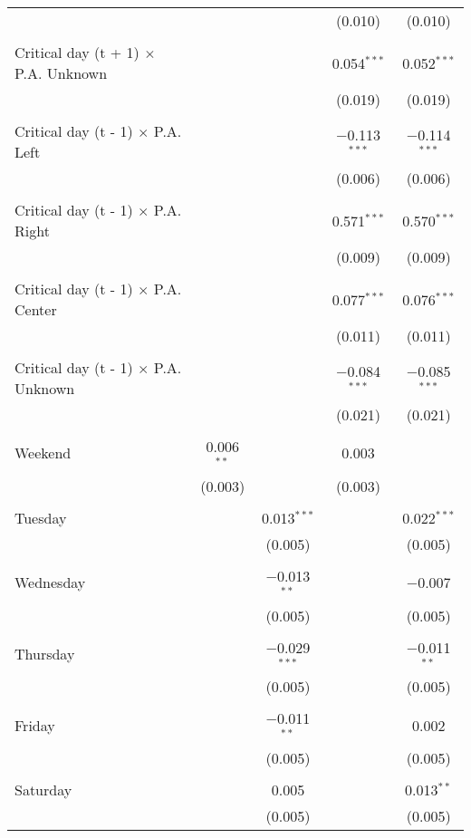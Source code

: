 \documentclass[
]{article}
\begin{document}
\begin{table}[!htbp]
{\begin{tabular}{@{\extracolsep{5pt}}lcccc}
  &  &  & (0.010) & (0.010) \\ 
  & & & & \\ 
 Critical day (t + 1) $\times$ P.A. Unknown &  &  & 0.054$^{***}$ & 0.052$^{***}$ \\ 
  &  &  & (0.019) & (0.019) \\ 
  & & & & \\ 
 Critical day (t - 1) $\times$ P.A. Left &  &  & $-$0.113$^{***}$ & $-$0.114$^{***}$ \\ 
  &  &  & (0.006) & (0.006) \\ 
  & & & & \\ 
 Critical day (t - 1) $\times$ P.A. Right &  &  & 0.571$^{***}$ & 0.570$^{***}$ \\ 
  &  &  & (0.009) & (0.009) \\ 
  & & & & \\ 
 Critical day (t - 1) $\times$ P.A. Center &  &  & 0.077$^{***}$ & 0.076$^{***}$ \\ 
  &  &  & (0.011) & (0.011) \\ 
  & & & & \\ 
 Critical day (t - 1) $\times$ P.A. Unknown &  &  & $-$0.084$^{***}$ & $-$0.085$^{***}$ \\ 
  &  &  & (0.021) & (0.021) \\ 
  & & & & \\ 
 Weekend & 0.006$^{**}$ &  & 0.003 &  \\ 
  & (0.003) &  & (0.003) &  \\ 
  & & & & \\ 
 Tuesday &  & 0.013$^{***}$ &  & 0.022$^{***}$ \\ 
  &  & (0.005) &  & (0.005) \\ 
  & & & & \\ 
 Wednesday &  & $-$0.013$^{**}$ &  & $-$0.007 \\ 
  &  & (0.005) &  & (0.005) \\ 
  & & & & \\ 
 Thursday &  & $-$0.029$^{***}$ &  & $-$0.011$^{**}$ \\ 
  &  & (0.005) &  & (0.005) \\ 
  & & & & \\ 
 Friday &  & $-$0.011$^{**}$ &  & 0.002 \\ 
  &  & (0.005) &  & (0.005) \\ 
  & & & & \\ 
 Saturday &  & 0.005 &  & 0.013$^{**}$ \\ 
  &  & (0.005) &  & (0.005) \\ 

\end{tabular}}
\end{table}
\end{document}
